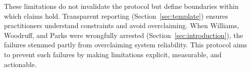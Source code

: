 These limitations do not invalidate the protocol but define boundaries within which claims hold. Transparent reporting (Section~\ref{sec:template}) ensures practitioners understand constraints and avoid overclaiming. When Williams, Woodruff, and Parks were wrongfully arrested (Section~\ref{sec:introduction}), the failures stemmed partly from overclaiming system reliability. This protocol aims to prevent such failures by making limitations explicit, measurable, and actionable.
